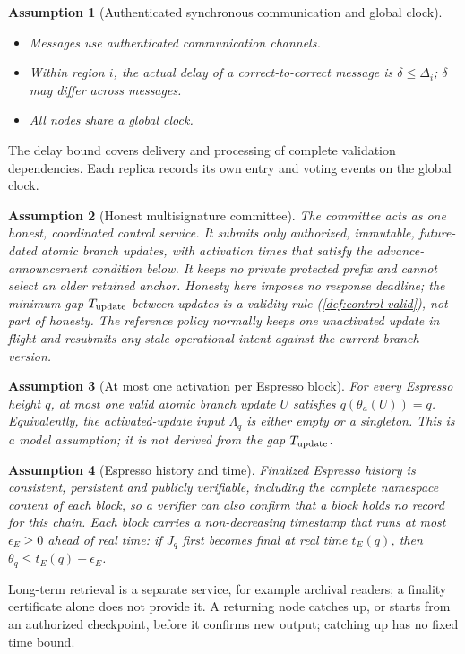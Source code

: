 \documentclass[11pt,a4paper]{article}
\newtheorem{assumption}[assumption]{Assumption}
\begin{document}
\begin{assumption}[Authenticated synchronous communication and global clock]
\label{ass:network}
\leavevmode\par
\begin{itemize}
\item Messages use authenticated communication channels.
\item Within region $i$, the actual delay of a correct-to-correct
message is $\delta\le\Delta_i$; $\delta$ may differ across messages.
\item All nodes share a global clock.
\end{itemize}
\end{assumption}
The delay bound covers delivery and processing of complete validation
dependencies. Each replica records its own entry and voting events on
the global clock.

\begin{assumption}[Honest multisignature committee]
\label{ass:committee}
The committee acts as one honest, coordinated control service. It
submits only authorized, immutable, future-dated atomic branch updates, with
activation times that satisfy the advance-announcement condition below. It keeps no private protected prefix and cannot select
an older retained anchor. Honesty here imposes no response deadline; the
minimum gap $T_{\rm update}$ between updates is a validity rule
(\cref{def:control-valid}), not part of honesty.  The reference policy
normally keeps one unactivated update in flight and resubmits any stale
operational intent against the current branch version.
\end{assumption}

\begin{assumption}[At most one activation per Espresso block]
\label{ass:single-activation}
For every Espresso height $q$, at most one valid atomic branch update
$U$ satisfies $q(\theta_a(U))=q$. Equivalently, the activated-update
input $\Lambda_q$ is either empty or a singleton. This is a model
assumption; it is not derived from the gap $T_{\rm update}$.
\end{assumption}

\begin{assumption}[Espresso history and time]
\label{ass:espresso}
Finalized Espresso history is consistent, persistent and publicly
verifiable, including the complete namespace content of each block, so a
verifier can also confirm that a block holds no record for this chain.
Each block carries a non-decreasing timestamp that runs at most
$\epsilon_E\ge0$ ahead of real time: if $J_q$ first becomes final at real
time $t_E(q)$, then $\theta_q\le t_E(q)+\epsilon_E$.
\end{assumption}
Long-term retrieval is a separate service, for example archival readers;
a finality certificate alone does not provide it. A returning node
catches up, or starts from an authorized checkpoint, before it confirms
new output; catching up has no fixed time bound.
\end{document}
